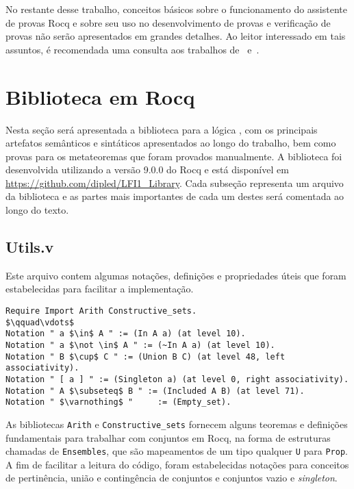     No restante desse trabalho, conceitos básicos sobre o funcionamento do assistente de provas Rocq e sobre seu uso no desenvolvimento de provas e verificação de provas não serão apresentados em grandes detalhes. Ao leitor interessado em tais assuntos, é recomendada uma consulta aos trabalhos de~ e~.

\section{Biblioteca em Rocq}\label{sec:biblioteca}
    Nesta seção será apresentada a biblioteca para a lógica \lfium{}, com os principais artefatos semânticos e sintáticos apresentados ao longo do trabalho, bem como provas para os metateoremas que foram provados manualmente. A biblioteca foi desenvolvida utilizando a versão 9.0.0 do Rocq e está disponível em \url{https://github.com/dipled/LFI1_Library}. Cada subseção representa um arquivo da biblioteca e as partes mais importantes de cada um destes será comentada ao longo do texto.

    \subsection{Utils.v}\label{sec:utils}

      Este arquivo contem algumas notações, definições e propriedades úteis que foram estabelecidas para facilitar a implementação.

      \begin{lstlisting}[name=Utils, frame=single, language=coq]
Require Import Arith Constructive_sets.
$\qquad\vdots$
Notation " a $\in$ A " := (In A a) (at level 10).
Notation " a $\not \in$ A " := (~In A a) (at level 10).
Notation " B $\cup$ C " := (Union B C) (at level 48, left associativity).
Notation " [ a ] " := (Singleton a) (at level 0, right associativity).
Notation " A $\subseteq$ B " := (Included A B) (at level 71). 
Notation " $\varnothing$ "     := (Empty_set).
      \end{lstlisting}

      As bibliotecas \texttt{Arith} e \texttt{Constructive\_sets} fornecem alguns teoremas e definições fundamentais para trabalhar com conjuntos em Rocq, na forma de estruturas chamadas de \texttt{Ensembles}, que são mapeamentos de um tipo qualquer \texttt{U} para \texttt{Prop}. A fim de facilitar a leitura do código, foram estabelecidas notações para conceitos de pertinência, união e contingência de conjuntos e conjuntos vazio e \textit{singleton}.

